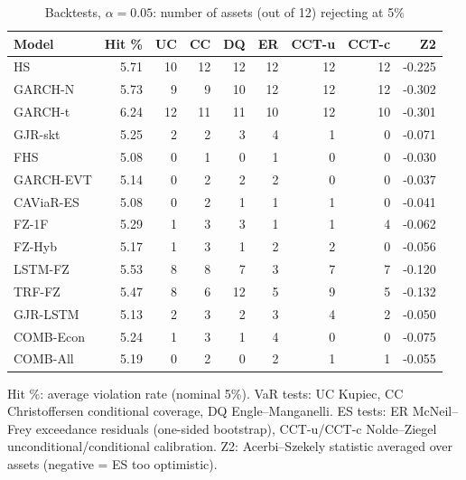 \begin{table}[htbp]
\centering
\footnotesize
\caption{Backtests, $\alpha=0.05$: number of assets (out of 12) rejecting at 5\%}
\label{tab:bt_a050}
\begin{tabular}{lrrrrrrrr}
\toprule
Model & Hit \% & UC & CC & DQ & ER & CCT-u & CCT-c & Z2 \\
\midrule
HS & 5.71 & 10 & 12 & 12 & 12 & 12 & 12 & -0.225 \\
GARCH-N & 5.73 & 9 & 9 & 10 & 12 & 12 & 12 & -0.302 \\
GARCH-t & 6.24 & 12 & 11 & 11 & 10 & 12 & 10 & -0.301 \\
GJR-skt & 5.25 & 2 & 2 & 3 & 4 & 1 & 0 & -0.071 \\
FHS & 5.08 & 0 & 1 & 0 & 1 & 0 & 0 & -0.030 \\
GARCH-EVT & 5.14 & 0 & 2 & 2 & 2 & 0 & 0 & -0.037 \\
CAViaR-ES & 5.08 & 0 & 2 & 1 & 1 & 1 & 0 & -0.041 \\
FZ-1F & 5.29 & 1 & 3 & 3 & 1 & 1 & 4 & -0.062 \\
FZ-Hyb & 5.17 & 1 & 3 & 1 & 2 & 2 & 0 & -0.056 \\
LSTM-FZ & 5.53 & 8 & 8 & 7 & 3 & 7 & 7 & -0.120 \\
TRF-FZ & 5.47 & 8 & 6 & 12 & 5 & 9 & 5 & -0.132 \\
GJR-LSTM & 5.13 & 2 & 3 & 2 & 3 & 4 & 2 & -0.050 \\
COMB-Econ & 5.24 & 1 & 3 & 1 & 4 & 0 & 0 & -0.075 \\
COMB-All & 5.19 & 0 & 2 & 0 & 2 & 1 & 1 & -0.055 \\
\bottomrule
\end{tabular}
\par\smallskip\parbox{\linewidth}{\scriptsize Hit \%: average violation rate (nominal 5\%). VaR tests: UC Kupiec, CC Christoffersen conditional coverage, DQ Engle--Manganelli. ES tests: ER McNeil--Frey exceedance residuals (one-sided bootstrap), CCT-u/CCT-c Nolde--Ziegel unconditional/conditional calibration. Z2: Acerbi--Szekely statistic averaged over assets (negative = ES too optimistic).}
\end{table}